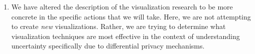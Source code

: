 \documentclass[11pt]{article}
\begin{document}
\begin{enumerate}
\item We have altered the description of the visualization research to
be more concrete in the specific actions that we will take.  Here, we are
not attempting to create \emph{new} visualizations.  Rather, we are trying
to determine what visualization techniques are most effective in the
context of understanding uncertainty specifically due to differential
privacy mechanisms.

\end{enumerate}
\end{document}
